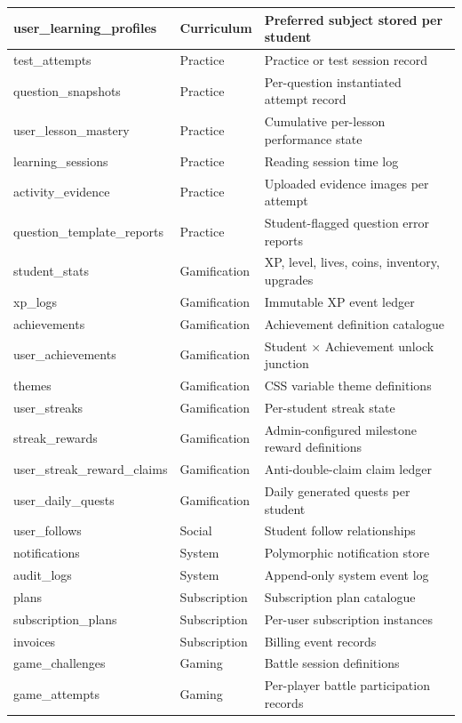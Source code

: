 \begin{longtable}{|p{5.4cm}|p{2.2cm}|p{6.4cm}|}
user\_learning\_profiles & Curriculum & Preferred subject stored per student \\ \hline
test\_attempts & Practice & Practice or test session record \\ \hline
question\_snapshots & Practice & Per-question instantiated attempt record \\ \hline
user\_lesson\_mastery & Practice & Cumulative per-lesson performance state \\ \hline
learning\_sessions & Practice & Reading session time log \\ \hline
activity\_evidence & Practice & Uploaded evidence images per attempt \\ \hline
question\_template\_reports & Practice & Student-flagged question error reports \\ \hline
student\_stats & Gamification & XP, level, lives, coins, inventory, upgrades \\ \hline
xp\_logs & Gamification & Immutable XP event ledger \\ \hline
achievements & Gamification & Achievement definition catalogue \\ \hline
user\_achievements & Gamification & Student $\times$ Achievement unlock junction \\ \hline
themes & Gamification & CSS variable theme definitions \\ \hline
user\_streaks & Gamification & Per-student streak state \\ \hline
streak\_rewards & Gamification & Admin-configured milestone reward definitions \\ \hline
user\_streak\_reward\_claims & Gamification & Anti-double-claim claim ledger \\ \hline
user\_daily\_quests & Gamification & Daily generated quests per student \\ \hline
user\_follows & Social & Student follow relationships \\ \hline
notifications & System & Polymorphic notification store \\ \hline
audit\_logs & System & Append-only system event log \\ \hline
plans & Subscription & Subscription plan catalogue \\ \hline
subscription\_plans & Subscription & Per-user subscription instances \\ \hline
invoices & Subscription & Billing event records \\ \hline
game\_challenges & Gaming & Battle session definitions \\ \hline
game\_attempts & Gaming & Per-player battle participation records \\ \hline
\end{longtable}
